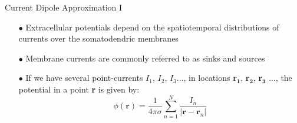 \documentclass[aspectratio=169, 9pt]{beamer}
\begin{document}
\begin{frame}{Current Dipole Approximation I}
  \begin{itemize}
    \item[$\bullet$] Extracellular potentials depend on the spatiotemporal distributions of currents over the somatodendric membranes
    \item[$\bullet$] Membrane currents are commonly referred to as sinks and sources
    \item[$\bullet$] If we have several point-currents $I_1$, $I_2$, $I_3$..., in locations \textbf{r}$\mathbf{_1}$, \textbf{r}$\mathbf{_2}$,    \textbf{r}$\mathbf{_3}$ ..., the potential in a point	 	\textbf{r} is given by:
     \begin{equation}
       \phi(\textbf{r}) = \frac{1}{4\pi\sigma} \sum_{n=1}^N \frac{I_n}{|\textbf{r}-\textbf{r}_n|}
      \end{equation}
  \end{itemize}
\end{frame}
\end{document}
